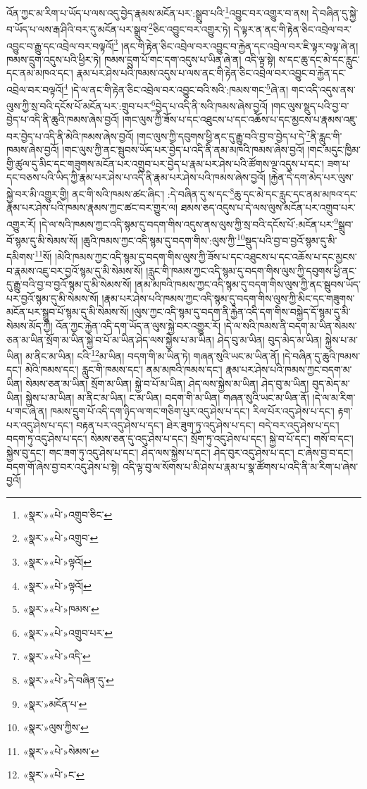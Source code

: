 འོན་ཀྱང་མ་རིག་པ་ཡོད་པ་ལས་འདུ་བྱེད་རྣམས་མངོན་པར་:སྒྲུབ་པའི་\footnote{«སྣར་»«པེ་»འགྲུབ་ཅིང་}འབྱུང་བར་འགྱུར་བ་ནས། དེ་བཞིན་དུ་སྐྱེ་བ་ཡོད་པ་ལས་རྒ་ཤིའི་བར་དུ་མངོན་པར་སྒྲུབ་\footnote{«སྣར་»«པེ་»འགྲུབ་}ཅིང་འབྱུང་བར་འགྱུར་ཏེ། དེ་ལྟར་ན་ནང་གི་རྟེན་ཅིང་འབྲེལ་བར་འབྱུང་བ་རྒྱུ་དང་འབྲེལ་བར་བལྟའོ།\footnote{«སྣར་»«པེ་»ལྟའོ།} །ནང་གི་རྟེན་ཅིང་འབྲེལ་བར་འབྱུང་བ་རྐྱེན་དང་འབྲེལ་བར་ཇི་ལྟར་བལྟ་ཞེ་ན། ཁམས་དྲུག་འདུས་པའི་ཕྱིར་ཏེ། ཁམས་དྲུག་པོ་གང་དག་འདུས་པ་ཡིན་ཞེ་ན། འདི་ལྟ་སྟེ། ས་དང་ཆུ་དང་མེ་དང་རླུང་དང་ནམ་མཁའ་དང་། རྣམ་པར་ཤེས་པའི་ཁམས་འདུས་པ་ལས་ནང་གི་རྟེན་ཅིང་འབྲེལ་བར་འབྱུང་བ་རྐྱེན་དང་འབྲེལ་བར་བལྟའོ།\footnote{«སྣར་»«པེ་»ལྟའོ།} །དེ་ལ་ནང་གི་རྟེན་ཅིང་འབྲེལ་བར་འབྱུང་བའི་སའི་:ཁམས་གང་\footnote{«སྣར་»«པེ་»ཁམས་}ཞེ་ན། གང་འདི་འདུས་ནས་ལུས་ཀྱི་སྲ་བའི་དངོས་པོ་མངོན་པར་:གྲུབ་པར་\footnote{«སྣར་»«པེ་»འགྲུབ་པར་}བྱེད་པ་འདི་ནི་སའི་ཁམས་ཞེས་བྱའོ། །གང་ལུས་སྡུད་པའི་བྱ་བ་བྱེད་པ་འདི་ནི་ཆུའི་ཁམས་ཞེས་བྱའོ། །གང་ལུས་ཀྱི་ཟོས་པ་དང་འཐུངས་པ་དང་འཆོས་པ་དང་མྱངས་པ་རྣམས་འཇུ་བར་བྱེད་པ་འདི་ནི་མེའི་ཁམས་ཞེས་བྱའོ། །གང་ལུས་ཀྱི་དབུགས་ཕྱི་ནང་དུ་རྒྱུ་བའི་བྱ་བ་བྱེད་པ་དེ་\footnote{«སྣར་»«པེ་»འདི་}ནི་རླུང་གི་ཁམས་ཞེས་བྱའོ། །གང་ལུས་ཀྱི་ནང་སྦུབས་ཡོད་པར་བྱེད་པ་འདི་ནི་ནམ་མཁའི་ཁམས་ཞེས་བྱའོ། །གང་མདུང་ཁྱིམ་གྱི་ཚུལ་དུ་མིང་དང་གཟུགས་མངོན་པར་འགྲུབ་པར་བྱེད་པ་རྣམ་པར་ཤེས་པའི་ཚོགས་ལྔ་འདུས་པ་དང་། ཟག་པ་དང་བཅས་པའི་ཡིད་ཀྱི་རྣམ་པར་ཤེས་པ་འདི་ནི་རྣམ་པར་ཤེས་པའི་ཁམས་ཞེས་བྱའོ། །རྐྱེན་དེ་དག་མེད་པར་ལུས་སྐྱེ་བར་མི་འགྱུར་གྱི། ནང་གི་སའི་ཁམས་ཚང་ཞིང་། :དེ་བཞིན་དུ་ས་དང་\footnote{«སྣར་»«པེ་»དེ་བཞིན་དུ་}ཆུ་དང་མེ་དང་རླུང་དང་ནམ་མཁའ་དང་རྣམ་པར་ཤེས་པའི་ཁམས་རྣམས་ཀྱང་ཚང་བར་གྱུར་ལ། ཐམས་ཅད་འདུས་པ་དེ་ལས་ལུས་མངོན་པར་འགྲུབ་པར་འགྱུར་རོ། །དེ་ལ་སའི་ཁམས་ཀྱང་འདི་སྙམ་དུ་བདག་གིས་འདུས་ནས་ལུས་ཀྱི་སྲ་བའི་དངོས་པོ་:མངོན་པར་\footnote{«སྣར་»མངོན་པ་}སྒྲུབ་བོ་སྙམ་དུ་མི་སེམས་སོ། །ཆུའི་ཁམས་ཀྱང་འདི་སྙམ་དུ་བདག་གིས་:ལུས་ཀྱི་\footnote{«སྣར་»ལུས་ཀྱིས་}སྡུད་པའི་བྱ་བ་བྱའོ་སྙམ་དུ་མི་དམིགས་\footnote{«སྣར་»«པེ་»སེམས་}སོ། །མེའི་ཁམས་ཀྱང་འདི་སྙམ་དུ་བདག་གིས་ལུས་ཀྱི་ཟོས་པ་དང་འཐུངས་པ་དང་འཆོས་པ་དང་མྱངས་བ་རྣམས་འཇུ་བར་བྱའོ་སྙམ་དུ་མི་སེམས་སོ། །རླུང་གི་ཁམས་ཀྱང་འདི་སྙམ་དུ་བདག་གིས་ལུས་ཀྱི་དབུགས་ཕྱི་ནང་དུ་རྒྱུ་བའི་བྱ་བ་བྱའོ་སྙམ་དུ་མི་སེམས་སོ། །ནམ་མཁའི་ཁམས་ཀྱང་འདི་སྙམ་དུ་བདག་གིས་ལུས་ཀྱི་ནང་སྦུབས་ཡོད་པར་བྱའོ་སྙམ་དུ་མི་སེམས་སོ། །རྣམ་པར་ཤེས་པའི་ཁམས་ཀྱང་འདི་སྙམ་དུ་བདག་གིས་ལུས་ཀྱི་མིང་དང་གཟུགས་མངོན་པར་སྒྲུབ་པོ་སྙམ་དུ་མི་སེམས་སོ། །ལུས་ཀྱང་འདི་སྙམ་དུ་བདག་ནི་རྐྱེན་འདི་དག་གིས་བསྐྱེད་དོ་སྙམ་དུ་མི་སེམས་མོད་ཀྱི། འོན་ཀྱང་རྐྱེན་འདི་དག་ཡོད་ན་ལུས་སྐྱེ་བར་འགྱུར་རོ། །དེ་ལ་སའི་ཁམས་ནི་བདག་མ་ཡིན་སེམས་ཅན་མ་ཡིན་སྲོག་མ་ཡིན་སྐྱེ་བ་པོ་མ་ཡིན་ཤེད་ལས་སྐྱེས་པ་མ་ཡིན། ཤེད་བུ་མ་ཡིན། བུད་མེད་མ་ཡིན། སྐྱེས་པ་མ་ཡིན། མ་ནིང་མ་ཡིན། ངའི་\footnote{«སྣར་»«པེ་»ང་}མ་ཡིན། བདག་གི་མ་ཡིན་ཏེ། གཞན་སུའི་ཡང་མ་ཡིན་ནོ། །དེ་བཞིན་དུ་ཆུའི་ཁམས་དང་། མེའི་ཁམས་དང་། རླུང་གི་ཁམས་དང་། ནམ་མཁའི་ཁམས་དང་། རྣམ་པར་ཤེས་པའི་ཁམས་ཀྱང་བདག་མ་ཡིན། སེམས་ཅན་མ་ཡིན། སྲོག་མ་ཡིན། སྐྱེ་བ་པོ་མ་ཡིན། ཤེད་ལས་སྐྱེས་མ་ཡིན། ཤེད་བུ་མ་ཡིན། བུད་མེད་མ་ཡིན། སྐྱེས་པ་མ་ཡིན། མ་ནིང་མ་ཡིན། ང་མ་ཡིན། བདག་གི་མ་ཡིན། གཞན་སུའི་ཡང་མ་ཡིན་ནོ། །དེ་ལ་མ་རིག་པ་གང་ཞེ་ན། ཁམས་དྲུག་པོ་འདི་དག་ཉིད་ལ་གང་གཅིག་པུར་འདུ་ཤེས་པ་དང་། རིལ་པོར་འདུ་ཤེས་པ་དང་། རྟག་པར་འདུ་ཤེས་པ་དང་། བརྟན་པར་འདུ་ཤེས་པ་དང་། ཐེར་ཟུག་ཏུ་འདུ་ཤེས་པ་དང་། བདེ་བར་འདུ་ཤེས་པ་དང་། བདག་ཏུ་འདུ་ཤེས་པ་དང་། སེམས་ཅན་དུ་འདུ་ཤེས་པ་དང་། སྲོག་ཏུ་འདུ་ཤེས་པ་དང་། སྐྱེ་བ་པོ་དང་། གསོ་བ་དང་། སྐྱེས་བུ་དང་། གང་ཟག་ཏུ་འདུ་ཤེས་པ་དང་། ཤེད་ལས་སྐྱེས་པ་དང་། ཤེད་བུར་འདུ་ཤེས་པ་དང་། ང་ཞེས་བྱ་བ་དང་། བདག་གོ་ཞེས་བྱ་བར་འདུ་ཤེས་པ་སྟེ། འདི་ལྟ་བུ་ལ་སོགས་པ་མི་ཤེས་པ་རྣམ་པ་སྣ་ཚོགས་པ་འདི་ནི་མ་རིག་པ་ཞེས་བྱའོ། 